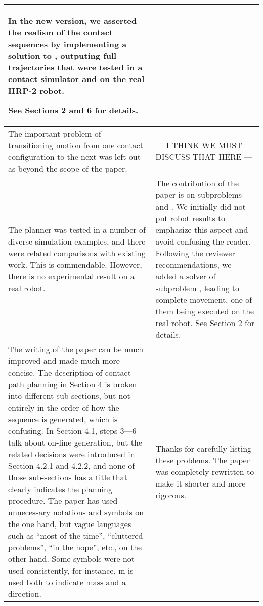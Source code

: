 \documentclass[a4paper]{article}
\begin{document}
\begin{longtable}{|p{21em}|p{21em}|}
In the new version, we asserted the realism of the contact sequences by implementing a solution to \mP3, outputing full trajectories that were tested in a contact simulator and on the real HRP-2 robot.

See Sections 2 and 6 for details.

\\ \hline %
The important problem of transitioning motion from one contact configuration to the next was left out as beyond the scope of the paper. 
&
--- I THINK WE MUST DISCUSS THAT HERE ---
\\ \hline %
The planner was tested in a number of diverse simulation examples, and there were related comparisons with existing work. This is commendable. However, there is no experimental result on a real robot. 
&
The contribution of the paper is on subproblems \mP1 and \mP2. 
We initially did not put robot results to emphasize this aspect and avoid confusing the reader.
Following the reviewer recommendations, we added a solver of subproblem \mP3, leading to complete movement, one of them being executed on the real robot. 
\newline See Section 2 for details.
\\ \hline %
The writing of the paper can be much improved and made much more concise. The description of contact path planning in Section 4 is broken into different sub-sections, but not entirely in the order of how the sequence is generated, which is confusing. In Section 4.1, steps 3—6 talk about on-line generation, but the related decisions were introduced in Section 4.2.1 and 4.2.2, and none of those sub-sections has a title that clearly indicates the planning procedure. The paper has used unnecessary notations and symbols on the one hand, but vague languages such as “most of the time”, “cluttered problems”, “in the hope”, etc., on the other hand. Some symbols were not used consistently, for instance, m is used both to indicate mass and a direction. 
&
Thanks for carefully listing these problems. 
The paper was completely rewritten to make it shorter and more rigorous.
\\ \hline %
\end{longtable}
\end{document}
